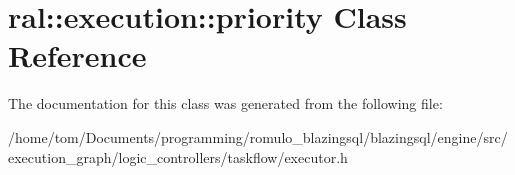 \hypertarget{classral_1_1execution_1_1priority}{}\section{ral\+:\+:execution\+:\+:priority Class Reference}
\label{classral_1_1execution_1_1priority}


The documentation for this class was generated from the following file\+:\begin{DoxyCompactItemize}
\item 
/home/tom/\+Documents/programming/romulo\+\_\+blazingsql/blazingsql/engine/src/execution\+\_\+graph/logic\+\_\+controllers/taskflow/executor.\+h\end{DoxyCompactItemize}
